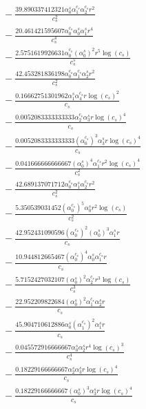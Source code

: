 \documentclass[10pt]{article}
\begin{document}
\begin{align*}
&{}  - \frac{39.890337412321 \alpha_{0}^s \alpha_{1}^{c_s} \alpha_{2}^{c_s} r^{2}}{c_{s}^{2}} \\
&{}  - \frac{20.461421595607 \alpha_{0}^{c_s} \alpha_{0}^s \alpha_{1}^s r^{4}}{c_{s}^{4}} \\
&{}  - \frac{2.5751619926631 \alpha_{0}^{c_s} \left(\alpha_{0}^s\right)^{2} r^{5} \log{\left(c_{s} \right)}}{c_{s}^{5}} \\
&{}  - \frac{42.453281836198 \alpha_{0}^{c_s} \alpha_{1}^{c_s} \alpha_{2}^s r^{2}}{c_{s}^{2}} \\
&{}  - \frac{0.16662751301962 \alpha_{1}^s \alpha_{4}^{c_s} r \log{\left(c_{s} \right)}^{2}}{c_{s}} \\
&{}  - \frac{0.0052083333333333 \alpha_{2}^{c_s} \alpha_{3}^s r \log{\left(c_{s} \right)}^{4}}{c_{s}} \\
&{}  - \frac{0.0052083333333333 \left(\alpha_{0}^{c_s}\right)^{3} \alpha_{3}^s r \log{\left(c_{s} \right)}^{4}}{c_{s}} \\
&{}  - \frac{0.041666666666667 \left(\alpha_{0}^s\right)^{4} \alpha_{1}^{c_s} r^{2} \log{\left(c_{s} \right)}^{4}}{c_{s}^{2}} \\
&{}  - \frac{42.689137071712 \alpha_{0}^{c_s} \alpha_{1}^s \alpha_{2}^{c_s} r^{2}}{c_{s}^{2}} \\
&{}  - \frac{5.350539031452 \left(\alpha_{0}^{c_s}\right)^{5} \alpha_{0}^s r^{2} \log{\left(c_{s} \right)}}{c_{s}^{2}} \\
&{}  - \frac{42.952431090596 \left(\alpha_{0}^{c_s}\right)^{2} \left(\alpha_{0}^s\right)^{3} \alpha_{1}^s r}{c_{s}} \\
&{}  - \frac{10.944812665467 \left(\alpha_{0}^{c_s}\right)^{4} \alpha_{0}^s \alpha_{1}^{c_s} r}{c_{s}} \\
&{}  - \frac{5.7152427032107 \left(\alpha_{0}^s\right)^{2} \alpha_{2}^{c_s} r^{3} \log{\left(c_{s} \right)}}{c_{s}^{3}} \\
&{}  - \frac{22.952209822684 \left(\alpha_{0}^s\right)^{2} \alpha_{1}^{c_s} \alpha_{2}^s r}{c_{s}} \\
&{}  - \frac{45.904710612886 \alpha_{0}^s \left(\alpha_{1}^{c_s}\right)^{2} \alpha_{1}^s r}{c_{s}} \\
&{}  - \frac{0.045572916666667 \alpha_{0}^s \alpha_{2}^s r^{4} \log{\left(c_{s} \right)}^{3}}{c_{s}^{4}} \\
&{}  - \frac{0.18229166666667 \alpha_{2}^s \alpha_{3}^s r \log{\left(c_{s} \right)}^{4}}{c_{s}} \\
&{}  - \frac{0.18229166666667 \left(\alpha_{0}^s\right)^{3} \alpha_{3}^s r \log{\left(c_{s} \right)}^{4}}{c_{s}} \\

\end{align*}
\end{document}
